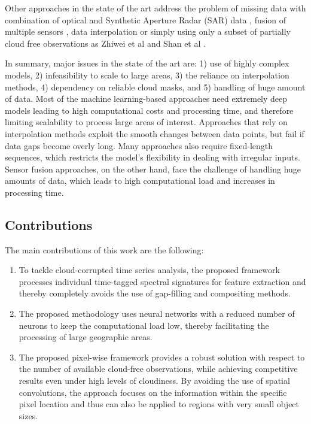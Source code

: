 \documentclass[journal,article,submit,pdftex,moreauthors]{Definitions/mdpi}
\begin{document}
Other approaches in the state of the art address the problem of missing data with combination of optical and Synthetic Aperture Radar (SAR) data \cite{Begue2018, Orynbaikyzy2019, Kussul2017, Tariq2022}, 
fusion of multiple sensors \cite{PierrePott2022, Heupel2018,MorenoMartinez2020}, data interpolation \cite{Russwurm2020, Kandasamy2013} or simply using only a subset of partially cloud free observations as Zhiwei et al \cite{Yi2020} and Shan et al \cite{He2022}.

In summary, major issues in the state of the art are: 1) use of highly complex models, 2) infeasibility to scale to large areas, 3) the reliance on interpolation methods, 4) dependency on reliable cloud masks, and 5) handling of huge amount of data. Most of the machine learning-based approaches need extremely deep models leading to high computational costs and processing time, and therefore limiting scalability to process large areas of interest. Approaches that rely on interpolation methods exploit the smooth changes between data points, but fail if data gaps become overly long. Many approaches also require fixed-length sequences, which restricts the model's flexibility in dealing with irregular inputs. Sensor fusion approaches, on the other hand, face the challenge of handling huge amounts of data, which leads to high computational load and increases in processing time. 

\subsection{Contributions}
The main contributions of this work are the following:
\begin{enumerate}
	\item To tackle cloud-corrupted time series analysis, the proposed framework processes individual time-tagged spectral signatures for feature extraction and thereby completely avoids the use of gap-filling and compositing methods.
	\item The proposed methodology uses neural networks with a reduced number of neurons to keep the computational load low, thereby facilitating the processing of large geographic areas.
	\item The proposed pixel-wise framework provides a robust solution with respect to the number of available cloud-free observations, while achieving competitive results even under high levels of cloudiness. By avoiding the use of spatial convolutions, the approach focuses on the information within the specific pixel location and thus can also be applied to regions with very small object sizes. 
\end{enumerate}
\end{document}
